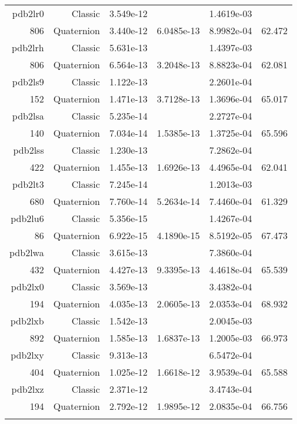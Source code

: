 \begin{xltabular}{\textwidth}{r|rS[table-format=1.3e+2]S[table-format=1.4e+2]S[table-format=1.4e+2]S[table-format=-1.3]}
pdb2lr0 & Classic & 3.549e-12 &  & 1.4619e-03 & \\
806 & Quaternion & 3.440e-12 & 6.0485e-13 & 8.9982e-04 & 62.472\\  \addlinespace
pdb2lrh & Classic & 5.631e-13 &  & 1.4397e-03 & \\
806 & Quaternion & 6.564e-13 & 3.2048e-13 & 8.8823e-04 & 62.081\\  \addlinespace
pdb2ls9 & Classic & 1.122e-13 &  & 2.2601e-04 & \\
152 & Quaternion & 1.471e-13 & 3.7128e-13 & 1.3696e-04 & 65.017\\  \addlinespace
pdb2lsa & Classic & 5.235e-14 &  & 2.2727e-04 & \\
140 & Quaternion & 7.034e-14 & 1.5385e-13 & 1.3725e-04 & 65.596\\  \addlinespace
pdb2lss & Classic & 1.230e-13 &  & 7.2862e-04 & \\
422 & Quaternion & 1.455e-13 & 1.6926e-13 & 4.4965e-04 & 62.041\\  \addlinespace
pdb2lt3 & Classic & 7.245e-14 &  & 1.2013e-03 & \\
680 & Quaternion & 7.760e-14 & 5.2634e-14 & 7.4460e-04 & 61.329\\  \addlinespace
pdb2lu6 & Classic & 5.356e-15 &  & 1.4267e-04 & \\
86 & Quaternion & 6.922e-15 & 4.1890e-15 & 8.5192e-05 & 67.473\\  \addlinespace
pdb2lwa & Classic & 3.615e-13 &  & 7.3860e-04 & \\
432 & Quaternion & 4.427e-13 & 9.3395e-13 & 4.4618e-04 & 65.539\\  \addlinespace
pdb2lx0 & Classic & 3.569e-13 &  & 3.4382e-04 & \\
194 & Quaternion & 4.035e-13 & 2.0605e-13 & 2.0353e-04 & 68.932\\  \addlinespace
pdb2lxb & Classic & 1.542e-13 &  & 2.0045e-03 & \\
892 & Quaternion & 1.585e-13 & 1.6837e-13 & 1.2005e-03 & 66.973\\  \addlinespace
pdb2lxy & Classic & 9.313e-13 &  & 6.5472e-04 & \\
404 & Quaternion & 1.025e-12 & 1.6618e-12 & 3.9539e-04 & 65.588\\  \addlinespace
pdb2lxz & Classic & 2.371e-12 &  & 3.4743e-04 & \\
194 & Quaternion & 2.792e-12 & 1.9895e-12 & 2.0835e-04 & 66.756\\  \addlinespace

\end{xltabular}

